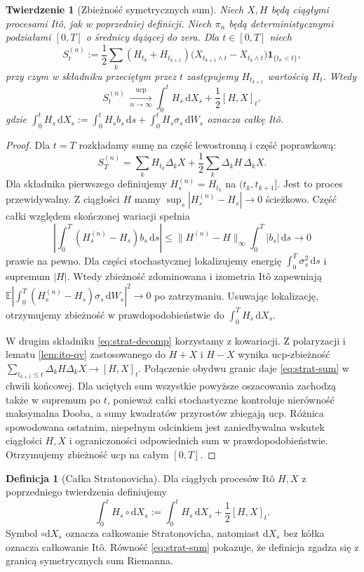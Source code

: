 \documentclass[11pt,a4paper,oneside]{report}
\numberwithin{equation}{chapter}
\theoremstyle{plain}
\newtheorem{twierdzenie}{Twierdzenie}[chapter]
\theoremstyle{definition}
\newtheorem{definicja}{Definicja}[chapter]
\theoremstyle{remark}
\newcommand{\E}{\mathbb{E}}
\newcommand{\ind}[1]{\mathbf{1}_{#1}}
\newcommand{\dd}{\mathrm{d}}
\newcommand{\norm}[1]{\lVert #1\rVert}
\begin{document}
\begin{twierdzenie}[Zbieżność symetrycznych sum]\label{thm:volIII:04:01}
\label{th:strat-sums}
Niech $X,H$ będą ciągłymi procesami Itô, jak w
poprzedniej definicji. Niech $\pi_n$ będą
\emph{deterministycznymi} podziałami $[0,T]$
o średnicy dążącej do zera. Dla $t\in[0,T]$
niech
\[
S_t^{(n)}:=\frac12\sum_k
(H_{t_k}+H_{t_{k+1}})
\bigl(X_{t_{k+1}\wedge t}-X_{t_k\wedge t}\bigr)
\ind{\{t_k<t\}},
\]
przy czym w składniku przeciętym przez $t$
zastępujemy $H_{t_{k+1}}$ wartością $H_t$.
Wtedy
\[
S_t^{(n)}\ \xrightarrow[n\to\infty]{\mathrm{ucp}}
\int_0^tH_s\,\dd X_s+\frac12[H,X]_t,
\tag{4.2}\label{eq:strat-sum}
\]
gdzie $\int_0^t H_s\,\dd X_s:=\int_0^t H_sb_s\,\dd s+
\int_0^t H_s\sigma_s\,\dd W_s$ oznacza całkę Itô.
\end{twierdzenie}
\begin{proof}
Dla $t=T$ rozkładamy sumę na część lewostronną i
część poprawkową:
\[
S_T^{(n)}=\sum_kH_{t_k}\Delta_kX
+\frac12\sum_k\Delta_kH\,\Delta_kX.
\tag{4.3}\label{eq:strat-decomp}
\]
Dla składnika pierwszego definiujemy
$H_s^{(n)}=H_{t_k}$ na $(t_k,t_{k+1}]$.
Jest to proces przewidywalny. Z ciągłości $H$ mamy
$\sup_s|H_s^{(n)}-H_s|\to0$ ścieżkowo. Część
całki względem skończonej wariacji spełnia
\[
\left|\int_0^T(H_s^{(n)}-H_s)b_s\,\dd s\right|
\le\norm{H^{(n)}-H}_\infty\int_0^T|b_s|\,\dd s
\longrightarrow0
\]
prawie na pewno. Dla części stochastycznej
lokalizujemy energię $\int_0^T\sigma_s^2\,\dd s$
i supremum $|H|$. Wtedy zbieżność zdominowana
i izometria Itô zapewniają
$\E|\int_0^T(H_s^{(n)}-H_s)\sigma_s\,\dd W_s|^2\to0$
po zatrzymaniu. Usuwając lokalizację, otrzymujemy
zbieżność w prawdopodobieństwie do $\int_0^TH_s\,\dd X_s$.

W drugim składniku \eqref{eq:strat-decomp} korzystamy
z kowariacji. Z polaryzacji i lematu
\ref{lem:ito-qv} zastosowanego do $H+X$ i $H-X$
wynika ucp-zbieżność
$\sum_{t_{k+1}\le t}\Delta_kH\Delta_kX\to[H,X]_t$.
Połączenie obydwu granic daje \eqref{eq:strat-sum}
w chwili końcowej. Dla uciętych sum wszystkie powyższe
oszacowania zachodzą także w supremum po $t$, ponieważ
całki stochastyczne kontroluje nierówność maksymalna
Dooba, a sumy kwadratów przyrostów zbiegają ucp.
Różnica spowodowana ostatnim, niepełnym odcinkiem
jest zaniedbywalna wskutek ciągłości $H,X$ i
ograniczoności odpowiednich sum w prawdopodobieństwie.
Otrzymujemy zbieżność ucp na całym $[0,T]$.
\end{proof}

\begin{definicja}[Całka Stratonovicha]\label{def:volIII:04:02}
Dla ciągłych procesów Itô $H,X$ z poprzedniego
twierdzenia definiujemy
\[
\int_0^tH_s\circ\dd X_s
:=\int_0^tH_s\,\dd X_s+\frac12[H,X]_t.
\tag{4.4}\label{eq:strat-def}
\]
Symbol $\circ\dd X_s$ oznacza całkowanie
Stratonovicha, natomiast $\dd X_s$ bez kółka
oznacza całkowanie Itô. Równość
\eqref{eq:strat-sum} pokazuje, że definicja zgadza
się z granicą symetrycznych sum Riemanna.
\end{definicja}
\end{document}
